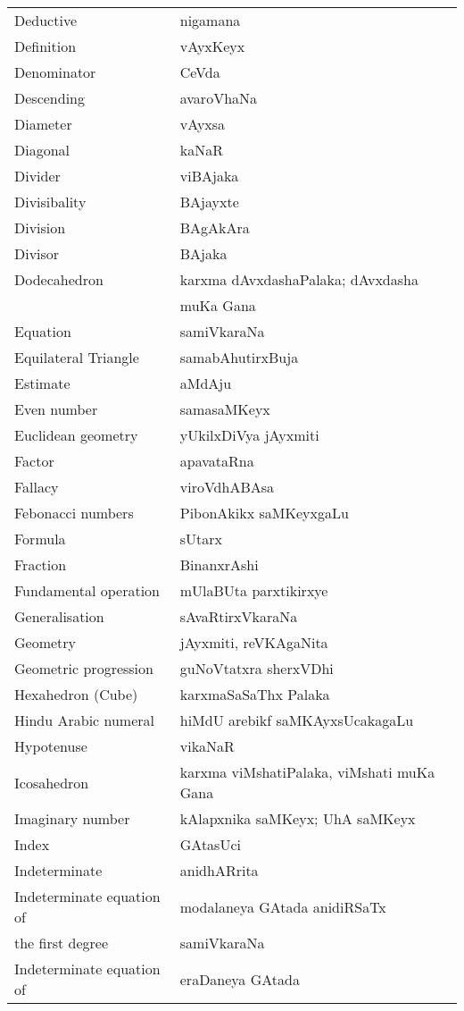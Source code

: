 {\begin{longtable}{>{\rm}l@{\hspace{1cm}}l}
Deductive & nigamana\\
Definition & vAyxKeyx\\
Denominator & CeVda\\
Descending & avaroVhaNa\\
Diameter & vAyxsa\\
Diagonal & kaNaR\\
Divider & viBAjaka\\
Divisibality & BAjayxte\\
Division & BAgAkAra\\
Divisor & BAjaka\\
Dodecahedron & karxma dAvxdashaPalaka; dAvxdasha\\[-0.1cm]
& muKa Gana\\
Equation & samiVkaraNa\\
Equilateral Triangle & samabAhutirxBuja\\
Estimate & aMdAju\\
Even number & samasaMKeyx\\
Euclidean geometry & yUkilxDiVya jAyxmiti\\
Factor & apavataRna\\
Fallacy & viroVdhABAsa\\
Febonacci numbers & PibonAkikx saMKeyxgaLu\\
Formula & sUtarx\\
Fraction & BinanxrAshi\\
Fundamental operation & mUlaBUta parxtikirxye\\
Generalisation & sAvaRtirxVkaraNa\\
Geometry & jAyxmiti, reVKAgaNita\\
Geometric progression & guNoVtatxra sherxVDhi\\
Hexahedron (Cube) & karxmaSaSaThx Palaka\\
Hindu Arabic numeral & hiMdU arebikf saMKAyxsUcakagaLu\\
Hypotenuse & vikaNaR\\
Icosahedron & karxma viMshatiPalaka, viMshati muKa Gana\\
Imaginary number  & kAlapxnika saMKeyx; UhA saMKeyx\\
Index & GAtasUci\\
Indeterminate & anidhARrita\\
Indeterminate equation of & modalaneya GAtada anidiRSaTx\\[-0.1cm]
the first degree & samiVkaraNa\\
Indeterminate equation of & eraDaneya GAtada\\[-0.1cm] 

\end{longtable}}
